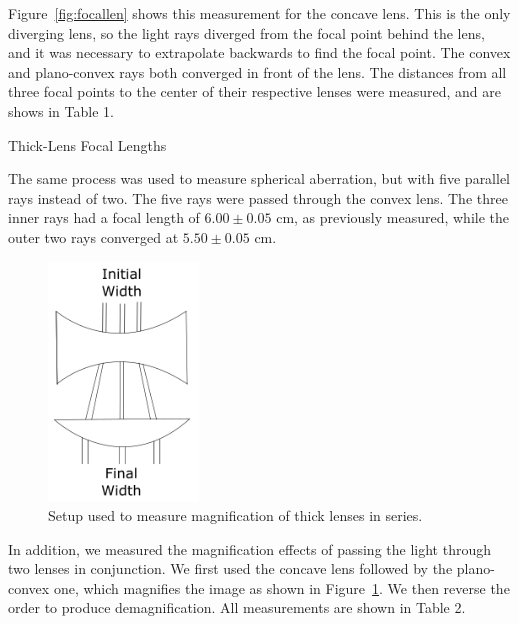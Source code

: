 \documentclass[journal]{IEEEtran}
\begin{document}
Figure~\ref{fig:focallen} shows this measurement for the concave lens. This is
the only diverging lens, so the light rays diverged from the focal point behind
the lens, and it was necessary to extrapolate backwards to find the focal
point. The convex and plano-convex rays both converged in front of the lens.
The distances from all three focal points to the center of their respective
lenses were measured, and are shows in Table 1.

\begin{table}[ht]
    \centering
    \caption*{\normalsize{Thick-Lens Focal Lengths}}
    \medskip
    \caption*{Table 1: Focal lengths of the three thick lenses.}
\end{table}

The same process was used to measure spherical aberration, but with five
parallel rays instead of two. The five rays were passed through the convex
lens. The three inner rays had a focal length of $6.00 \pm 0.05$ cm, as
previously measured, while the outer two rays converged at $5.50 \pm 0.05$ cm.

\begin{figure}[ht!]
\centering
\includegraphics[width=40mm]{magnification.png}
\caption{Setup used to measure magnification of thick lenses in series.}
\label{fig:magnification}
\end{figure}

In addition, we measured the magnification effects of passing the light through
two lenses in conjunction. We first used the concave lens followed by the
plano-convex one, which magnifies the image as shown in
Figure~\ref{fig:magnification}. We then reverse the order to produce
demagnification. All measurements are shown in Table 2.
\end{document}
